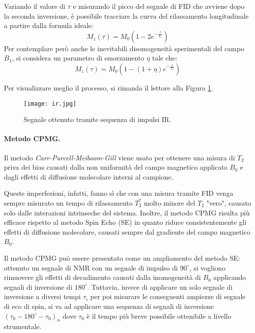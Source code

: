 Variando il valore di $\tau$ e misurando il picco del segnale di FID che avviene dopo la seconda inversione, è possibile tracciare la curva del rilassamento longitudinale a partire dalla formula ideale:
\begin{equation}
	M_z(\tau)=M_0\left(1 - 2e^{-\frac{\tau}{T_1}}\right)
\end{equation}
Per contemplare però anche le inevitabili disomogeneità sperimentali del campo $B_1$, si considera un parametro di smorzamento $\eta$ tale che:
\begin{equation}
	M_z(\tau)=M_0\left(1 - (1+\eta)e^{-\frac{\tau}{T_1}}\right)
\end{equation}

Per visualizzare meglio il processo, si rimanda il lettore alla Figura \ref{fig:ir}.

\begin{figure}[ht]
\centering
\texttt{[image: ir.jpg]}
\caption{Segnale ottenuto tramite sequenza di impulsi IR.}
\label{fig:ir}
\end{figure}

\paragraph{Metodo CPMG.}

Il metodo \textit{Carr-Purcell-Meiboom-Gill} viene usato per ottenere una misura di $T_2$ priva dei bias causati dalla non uniformità del campo magnetico applicato $B_0$ e dagli effetti di diffusione molecolare interni al campione.

Queste imperfezioni, infatti, fanno sì che con una misura tramite FID venga sempre misurato un tempo di rilassamento $T_2^*$ molto minore del $T_2$ "vero", causato solo dalle interazioni intrinseche del sistema. Inoltre, il metodo CPMG risulta più efficace rispetto al metodo Spin Echo (SE) in quanto riduce consistentemente gli effetti di diffusione molecolare, causati sempre dal gradiente del campo magnetico $B_0$.

Il metodo CPMG può essere presentato come un ampliamento del metodo SE: ottenuto un segnale di NMR con un segnale di impulso di $90^\circ$, si vogliono rimuovere gli effetti di decadimento causati dalla inomogeneità di $B_0$ applicando segnali di inversione di $180^\circ$. Tuttavia, invece di applicare un solo segnale di inversione a diversi tempi $\tau_i$ per poi misurare le conseguenti ampiezze di segnale di eco di spin, si va ad applicare una sequenza di segnali di inversione $(\tau_0 - 180^\circ - \tau_0)_n$ dove $\tau_0$ è il tempo più breve possibile ottenibile a livello strumentale.\\

